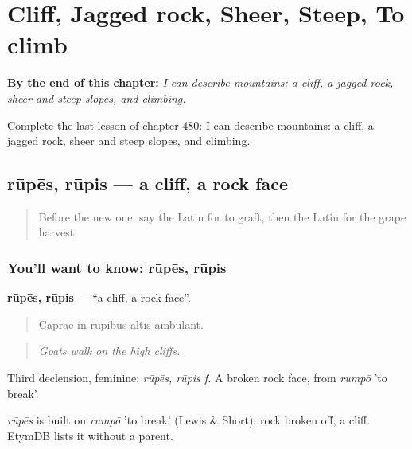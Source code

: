 
\chapter{Cliff, Jagged rock, Sheer, Steep, To climb}
\label{ch:la-cliff-jagged-rock-sheer-steep-to-climb}

\begin{chapteropening}
\textbf{By the end of this chapter:} \emph{I can describe mountains: a cliff, a jagged rock, sheer and steep slopes, and climbing.}

Complete the last lesson of chapter 480: I can describe mountains: a cliff, a jagged rock, sheer and steep slopes, and climbing.
\end{chapteropening}

\section[rūpēs, rūpis]{rūpēs, rūpis — a cliff, a rock face}

\label{lesson:LA-C480-rupes}



\begin{quote}
Before the new one: say the Latin for to graft, then the Latin for the grape harvest.
\end{quote}

\subsection*{You'll want to know: rūpēs, rūpis}
\textbf{rūpēs, rūpis} — \textquotedblleft{}a cliff, a rock face\textquotedblright{}.

\begin{quote}
Caprae in rūpibus altīs ambulant.
\end{quote}

\begin{quote}
\emph{Goats walk on the high cliffs.}
\end{quote}

Third declension, feminine: \emph{rūpēs, rūpis f.} A broken rock face, from \emph{rumpō} 'to break'.

\begin{cousinweb}
\emph{rūpēs} is built on \emph{rumpō} 'to break' (Lewis \& Short): rock broken off, a cliff. EtymDB lists it without a parent.
\end{cousinweb}

